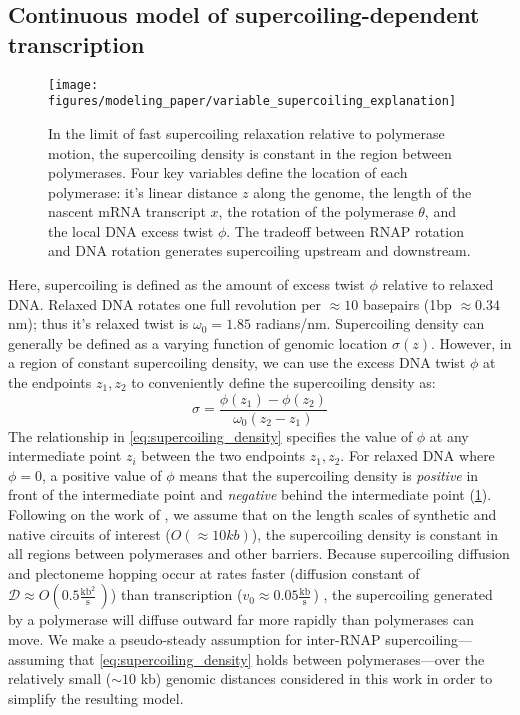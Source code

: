 \documentclass[11pt]{article}
\newcommand{\units}[2]{\frac{\text{#1}}{\text{#2}}\,}
\begin{document}
\subsection{Continuous model of supercoiling-dependent transcription}

\begin{figure}[h]
    \centering
    \texttt{[image: figures/modeling\_paper/variable\_supercoiling\_explanation]}
    \caption{In the limit of fast supercoiling relaxation relative to polymerase motion, the supercoiling density is constant in the region between polymerases. Four key variables define the location of each polymerase: it's linear distance \(z\) along the genome, the length of the nascent mRNA transcript \(x\), the rotation of the polymerase \(\theta\), and the local DNA excess twist \(\phi\). The tradeoff between RNAP rotation and DNA rotation generates supercoiling upstream and downstream.}
    \label{fig:key_variables_diagram}
\end{figure}
Here, supercoiling is defined as the amount of excess twist \(\phi\) relative to relaxed DNA. Relaxed DNA rotates  one full revolution per \(\approx10\) basepairs (1bp \(\approx 0.34\) nm); thus it's relaxed twist is \(\omega_0 = 1.85\) radians/nm. Supercoiling density can generally be defined as a varying function of genomic location \(\sigma(z)\). However, in a region of constant supercoiling density, we can use the excess DNA twist \(\phi\) at the endpoints \(z_1, z_2\) to conveniently define the supercoiling density as:
\begin{equation}
    \sigma = \frac{\phi(z_1) - \phi(z_2)}{\omega_0 (z_2 - z_1)}
\label{eq:supercoiling_density}
\end{equation}
The relationship in \cref{eq:supercoiling_density} specifies the value of \(\phi\) at any intermediate point \(z_i\) between the two endpoints \(z_1, z_2\). For relaxed DNA where \(\phi=0\), a positive value of \(\phi\) means that the supercoiling density is \emph{positive} in front of the intermediate point and \emph{negative} behind the intermediate point (\cref{fig:key_variables_diagram}). Following on the work of \textcite{sevierPropertiesGeneExpression2018}, we assume that on the length scales of synthetic and native circuits of interest (\(O(\approx10kb)\)), the supercoiling density is constant in all regions between polymerases and other barriers. Because supercoiling diffusion and plectoneme hopping \parencite{loenhoutDynamicsDNASupercoils2012} occur at rates faster (diffusion constant of \(\mathcal{D} \approx O(0.5 \units{kb$^2$}{s})\)) than transcription (\(v_0 \approx 0.05 \units{kb}{s}\)) \parencite{munizRNAPolymeraseII2021}, the supercoiling generated by a polymerase will diffuse outward far more rapidly than polymerases can move. We make a pseudo-steady assumption for inter-RNAP supercoiling---assuming that \cref{eq:supercoiling_density} holds between polymerases---over the relatively small (\(\sim 10\) kb) genomic distances considered in this work in order to simplify the resulting model.
\end{document}
